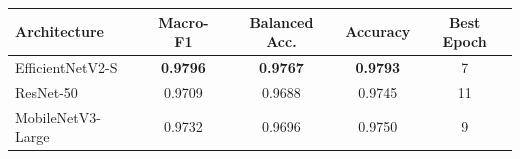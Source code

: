 \begin{tabular}{lcccc}
\toprule
\textbf{Architecture} & \textbf{Macro-F1} & \textbf{Balanced Acc.} & \textbf{Accuracy} & \textbf{Best Epoch} \\
\midrule
EfficientNetV2-S  & \textbf{0.9796} & \textbf{0.9767} & \textbf{0.9793} & 7 \\
ResNet-50         & 0.9709 & 0.9688 & 0.9745 & 11 \\
MobileNetV3-Large & 0.9732 & 0.9696 & 0.9750 & 9 \\
\bottomrule
\end{tabular}
